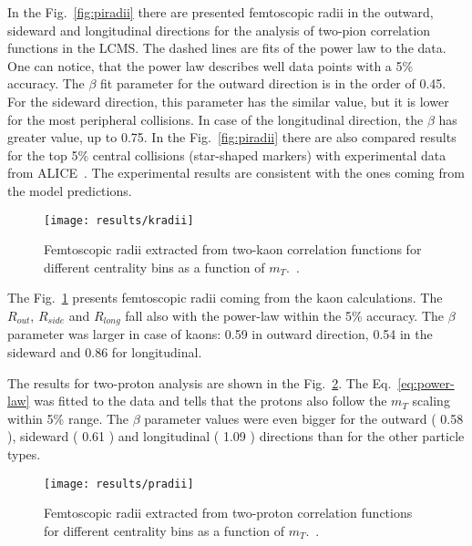       In the Fig.~\ref{fig:piradii} there are presented femtoscopic radii in the outward, sideward and longitudinal directions for the analysis of two-pion correlation functions in the LCMS.
      The dashed lines are fits of the power law to the data.
      One can notice, that the power law describes well data points with a 5\% accuracy.
      The $\beta$ fit parameter for the outward direction is in the order of 0.45.
      For the sideward direction, this parameter has the similar value, but it is lower for the most peripheral collisions.
      In case of the longitudinal direction, the $\beta$ has greater value, up to 0.75.
      In the Fig.~\ref{fig:piradii} there are also compared results for the top 5\% central collisions (star-shaped markers) with experimental data from ALICE~\cite{alice_pion}.
      The experimental results are consistent with the ones coming from the model predictions.
      \begin{figure}[b]
        \centering
        \centerline{\texttt{[image: results/kradii]}}
        \caption{Femtoscopic radii extracted from two-kaon correlation functions for different centrality bins as a function of $m_T$.~\cite{galazyn}.}
      \label{fig:kradii}
      \end{figure}

      The Fig.~\ref{fig:kradii} presents femtoscopic radii coming from the kaon calculations.
      The $R_{out}$, $R_{side}$ and $R_{long}$ fall also with the power-law within the 5\% accuracy.
      The $\beta$ parameter was larger in case of kaons: 0.59 in outward direction, 0.54 in the sideward and 0.86 for longitudinal.

      The results for two-proton analysis are shown in the Fig.~\ref{fig:pradii}.
      The Eq.~\ref{eq:power-law} was fitted to the data and tells that the protons also follow the $m_T$ scaling within 5\% range.
      The $\beta$ parameter values were even bigger for the outward ( 0.58 ), sideward ( 0.61 ) and longitudinal ( 1.09 ) directions than for the other particle types. 

      \begin{figure}[b]
        \centering
        \centerline{\texttt{[image: results/pradii]}}
        \caption{Femtoscopic radii extracted from two-proton correlation functions for different centrality bins as a function of $m_T$.~\cite{galazyn}.}
      \label{fig:pradii}
      \end{figure}

